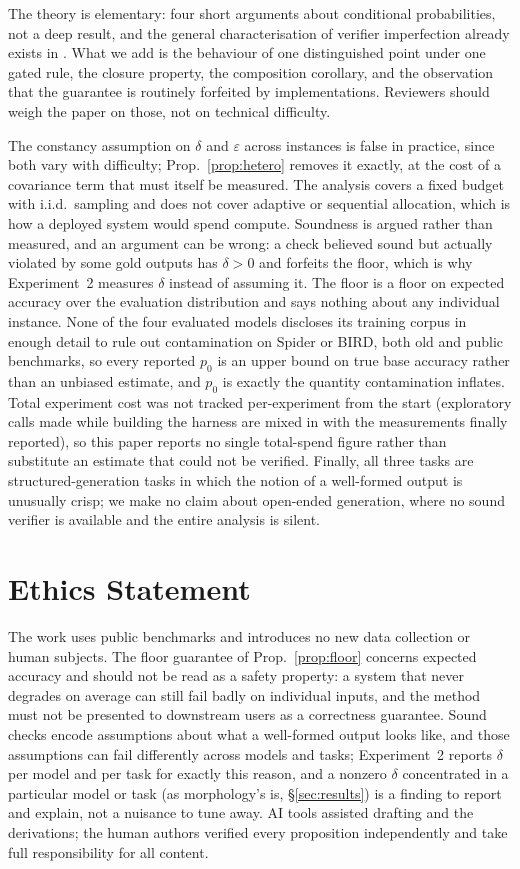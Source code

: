 \documentclass[11pt]{article}
\begin{document}
The theory is elementary: four short arguments about conditional probabilities, not a deep result, and the general characterisation of verifier imperfection already exists in \citet{dorner2025rocnreroll}. What we add is the behaviour of one distinguished point under one gated rule, the closure property, the composition corollary, and the observation that the guarantee is routinely forfeited by implementations. Reviewers should weigh the paper on those, not on technical difficulty.

The constancy assumption on $\delta$ and $\varepsilon$ across instances is false in practice, since both vary with difficulty; Prop.~\ref{prop:hetero} removes it exactly, at the cost of a covariance term that must itself be measured. The analysis covers a fixed budget with i.i.d.\ sampling and does not cover adaptive or sequential allocation, which is how a deployed system would spend compute. Soundness is argued rather than measured, and an argument can be wrong: a check believed sound but actually violated by some gold outputs has $\delta>0$ and forfeits the floor, which is why Experiment~2 measures $\delta$ instead of assuming it. The floor is a floor on expected accuracy over the evaluation distribution and says nothing about any individual instance. None of the four evaluated models discloses its training corpus in enough detail to rule out contamination on Spider or BIRD, both old and public benchmarks, so every reported $p_0$ is an upper bound on true base accuracy rather than an unbiased estimate, and $p_0$ is exactly the quantity contamination inflates. Total experiment cost was not tracked per-experiment from the start (exploratory calls made while building the harness are mixed in with the measurements finally reported), so this paper reports no single total-spend figure rather than substitute an estimate that could not be verified. Finally, all three tasks are structured-generation tasks in which the notion of a well-formed output is unusually crisp; we make no claim about open-ended generation, where no sound verifier is available and the entire analysis is silent.

\section*{Ethics Statement}
The work uses public benchmarks and introduces no new data collection or human subjects. The floor guarantee of Prop.~\ref{prop:floor} concerns expected accuracy and should not be read as a safety property: a system that never degrades on average can still fail badly on individual inputs, and the method must not be presented to downstream users as a correctness guarantee. Sound checks encode assumptions about what a well-formed output looks like, and those assumptions can fail differently across models and tasks; Experiment~2 reports $\delta$ per model and per task for exactly this reason, and a nonzero $\delta$ concentrated in a particular model or task (as morphology's is, \S\ref{sec:results}) is a finding to report and explain, not a nuisance to tune away. AI tools assisted drafting and the derivations; the human authors verified every proposition independently and take full responsibility for all content.
\end{document}
